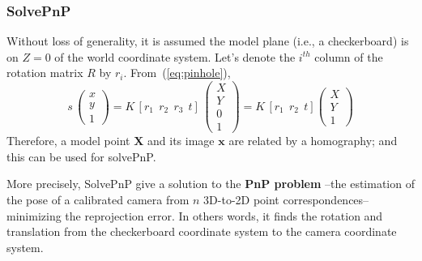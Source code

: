 


\subsubsection{SolvePnP}
\label{sec:solvePnP}

Without loss of generality, it is assumed the model plane (i.e., a checkerboard) is on $Z=0$ of the world coordinate system. Let's denote the $i^{th}$ column of the rotation matrix $R$ by $r_i$. From~(\ref{eq:pinhole}),
\begin{equation}
  s\,\begin{pmatrix}
      x \\
      y \\
      1
\end{pmatrix}
= K\, [r_1~~r_2~~r_3~~t]\,\begin{pmatrix}
      X \\
      Y \\
      0 \\
      1
\end{pmatrix}
= K\, [r_1~~r_2~~t]\begin{pmatrix}
      X \\
      Y \\
      1
\end{pmatrix}
\end{equation}
Therefore, a model point $\mathbf{X}$ and its image $\mathbf{x}$ are related by a homography; and this can be used for solvePnP. %

More precisely, SolvePnP give a solution to the \textbf{PnP problem} --the estimation of the pose of a calibrated camera from $n$ 3D-to-2D point correspondences-- minimizing the reprojection error. In others words, it finds the rotation and translation from the checkerboard coordinate system to the camera coordinate system.



%
%
%
%




